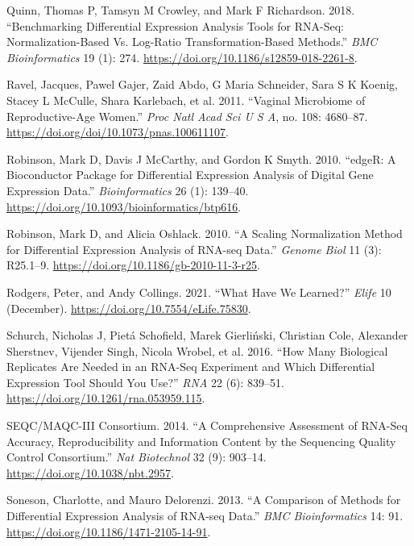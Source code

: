 \documentclass[
]{article}
\newlength{\cslhangindent}
\newlength{\cslentryspacingunit} %
\newenvironment{CSLReferences}[2] %
 {%
  \setlength{\parindent}{0pt}
  \ifodd #1
  \let\oldpar\par
  \def\par{\hangindent=\cslhangindent\oldpar}
  \fi
  \setlength{\parskip}{#2\cslentryspacingunit}
 }%
 {}
\begin{document}
\begin{CSLReferences}{1}{0}
\leavevmode{}%
Quinn, Thomas P, Tamsyn M Crowley, and Mark F Richardson. 2018.
{``Benchmarking Differential Expression Analysis Tools for RNA-Seq:
Normalization-Based Vs. Log-Ratio Transformation-Based Methods.''}
\emph{BMC Bioinformatics} 19 (1): 274.
\url{https://doi.org/10.1186/s12859-018-2261-8}.

\leavevmode{}%
Ravel, Jacques, Pawel Gajer, Zaid Abdo, G Maria Schneider, Sara S K
Koenig, Stacey L McCulle, Shara Karlebach, et al. 2011. {``Vaginal
Microbiome of Reproductive-Age Women.''} \emph{Proc Natl Acad Sci U S
A}, no. 108: 4680--87. \url{https://doi.org/doi/10.1073/pnas.100611107}.

\leavevmode{}%
Robinson, Mark D, Davis J McCarthy, and Gordon K Smyth. 2010. {``edgeR:
A Bioconductor Package for Differential Expression Analysis of Digital
Gene Expression Data.''} \emph{Bioinformatics} 26 (1): 139--40.
\url{https://doi.org/10.1093/bioinformatics/btp616}.

\leavevmode{}%
Robinson, Mark D, and Alicia Oshlack. 2010. {``A Scaling Normalization
Method for Differential Expression Analysis of {RNA-seq} Data.''}
\emph{Genome Biol} 11 (3): R25.1--9.
\url{https://doi.org/10.1186/gb-2010-11-3-r25}.

\leavevmode{}%
Rodgers, Peter, and Andy Collings. 2021. {``What Have We Learned?''}
\emph{Elife} 10 (December). \url{https://doi.org/10.7554/eLife.75830}.

\leavevmode{}%
Schurch, Nicholas J, Pietá Schofield, Marek Gierliński, Christian Cole,
Alexander Sherstnev, Vijender Singh, Nicola Wrobel, et al. 2016. {``How
Many Biological Replicates Are Needed in an RNA-Seq Experiment and Which
Differential Expression Tool Should You Use?''} \emph{RNA} 22 (6):
839--51. \url{https://doi.org/10.1261/rna.053959.115}.

\leavevmode{}%
SEQC/MAQC-III Consortium. 2014. {``A Comprehensive Assessment of RNA-Seq
Accuracy, Reproducibility and Information Content by the Sequencing
Quality Control Consortium.''} \emph{Nat Biotechnol} 32 (9): 903--14.
\url{https://doi.org/10.1038/nbt.2957}.

\leavevmode{}%
Soneson, Charlotte, and Mauro Delorenzi. 2013. {``A Comparison of
Methods for Differential Expression Analysis of {RNA-seq} Data.''}
\emph{BMC Bioinformatics} 14: 91.
\url{https://doi.org/10.1186/1471-2105-14-91}.


\end{CSLReferences}
\end{document}
